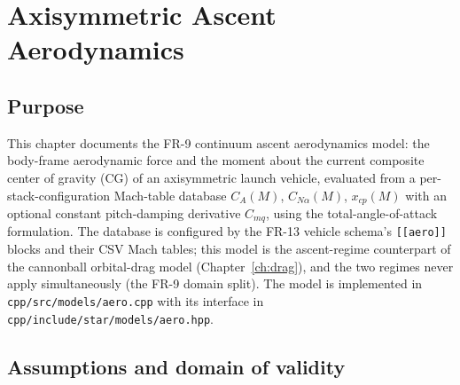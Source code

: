\chapter{Axisymmetric Ascent Aerodynamics}
\label{ch:aero}

\section{Purpose}
\label{sec:aero:purpose}

This chapter documents the FR-9 continuum ascent aerodynamics model: the
body-frame aerodynamic force and the moment about the current composite
center of gravity (CG) of an axisymmetric launch vehicle, evaluated from a
per-stack-configuration Mach-table database $C_A(M)$, $C_{N\alpha}(M)$,
$x_{cp}(M)$ with an optional constant pitch-damping derivative $C_{mq}$,
using the total-angle-of-attack formulation. The database is configured by
the FR-13 vehicle schema's \texttt{[[aero]]} blocks and their CSV Mach
tables; this model is the ascent-regime counterpart of the cannonball
orbital-drag model (Chapter~\ref{ch:drag}), and the two regimes never
apply simultaneously (the FR-9 domain split). The model is implemented in
\texttt{cpp/src/models/aero.cpp} with its interface in
\texttt{cpp/include/star/models/aero.hpp}.

\section{Assumptions and domain of validity}
\label{sec:aero:domain}

